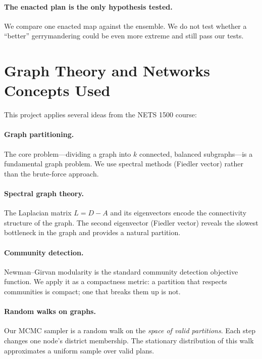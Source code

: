 \documentclass[11pt]{article}
\begin{document}
\paragraph{The enacted plan is the only hypothesis tested.}
We compare one enacted map against the ensemble. We do not test whether
a ``better'' gerrymandering could be even more extreme and still pass
our tests.

\section{Graph Theory and Networks Concepts Used}
\label{sec:concepts}

This project applies several ideas from the NETS 1500 course:

\paragraph{Graph partitioning.}
The core problem---dividing a graph into $k$ connected, balanced
subgraphs---is a fundamental graph problem. We use spectral methods
(Fiedler vector) rather than the brute-force approach.

\paragraph{Spectral graph theory.}
The Laplacian matrix $L = D - A$ and its eigenvectors encode the
connectivity structure of the graph. The second eigenvector (Fiedler
vector) reveals the slowest bottleneck in the graph and provides a
natural partition.

\paragraph{Community detection.}
Newman--Girvan modularity is the standard community detection objective
function. We apply it as a compactness metric: a partition that
respects communities is compact; one that breaks them up is not.

\paragraph{Random walks on graphs.}
Our MCMC sampler is a random walk on the \emph{space of valid
partitions}. Each step changes one node's district membership. The
stationary distribution of this walk approximates a uniform sample
over valid plans.
\end{document}
